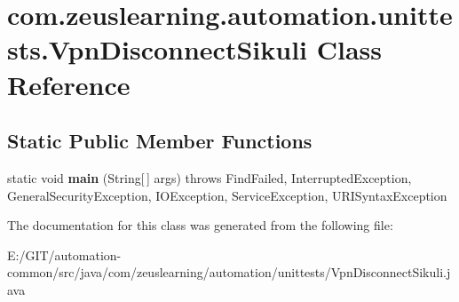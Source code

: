 \hypertarget{classcom_1_1zeuslearning_1_1automation_1_1unittests_1_1VpnDisconnectSikuli}{}\section{com.\+zeuslearning.\+automation.\+unittests.\+Vpn\+Disconnect\+Sikuli Class Reference}
\label{classcom_1_1zeuslearning_1_1automation_1_1unittests_1_1VpnDisconnectSikuli}
\subsection*{Static Public Member Functions}
\begin{DoxyCompactItemize}
\item 
\hypertarget{classcom_1_1zeuslearning_1_1automation_1_1unittests_1_1VpnDisconnectSikuli_a644c7dbb280ace4372b635d1fac814e2}{}\label{classcom_1_1zeuslearning_1_1automation_1_1unittests_1_1VpnDisconnectSikuli_a644c7dbb280ace4372b635d1fac814e2} 
static void {\bfseries main} (String\mbox{[}$\,$\mbox{]} args)  throws Find\+Failed,             Interrupted\+Exception, General\+Security\+Exception, I\+O\+Exception,             Service\+Exception, U\+R\+I\+Syntax\+Exception 
\end{DoxyCompactItemize}


The documentation for this class was generated from the following file\+:\begin{DoxyCompactItemize}
\item 
E\+:/\+G\+I\+T/automation-\/common/src/java/com/zeuslearning/automation/unittests/Vpn\+Disconnect\+Sikuli.\+java\end{DoxyCompactItemize}
